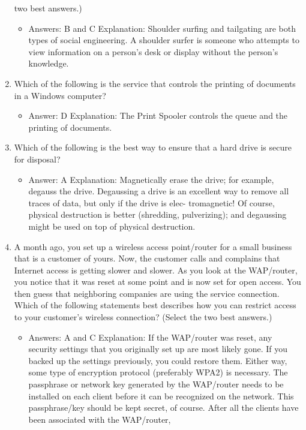 \documentclass{article}
\begin{document}
\begin{enumerate}
two best answers.)
    \begin{itemize}
        \item Answers: B and C
Explanation: Shoulder surfing and tailgating are both types of social engineering. A
shoulder surfer is someone who attempts to view information on a person’s desk or
display without the person’s knowledge.
    \end{itemize}
    \item Which of the following is the service that controls the printing of
documents in a Windows computer?
    \begin{itemize}
        \item Answer: D
Explanation: The Print Spooler controls the queue and the printing of documents.
    \end{itemize}
    \item Which of the following is the best way to ensure that a hard drive
is secure for disposal?
    \begin{itemize}
        \item Answer: A
Explanation: Magnetically erase the drive; for example, degauss the drive. Degaussing
a drive is an excellent way to remove all traces of data, but only if the drive is elec-
tromagnetic! Of course, physical destruction is better (shredding, pulverizing); and
degaussing might be used on top of physical destruction.
    \end{itemize}
    \item A month ago, you set up a wireless access point/router for a small
business that is a customer of yours. Now, the customer calls and
complains that Internet access is getting slower and slower. As you
look at the WAP/router, you notice that it was reset at some point
and is now set for open access. You then guess that neighboring
companies are using the service connection. Which of the following
statements best describes how you can restrict access to your
customer’s wireless connection? (Select the two best answers.)
    \begin{itemize}
        \item Answers: A and C
Explanation: If the WAP/router was reset, any security settings that you originally set
up are most likely gone. If you backed up the settings previously, you could restore
them. Either way, some type of encryption protocol (preferably WPA2) is necessary.
The passphrase or network key generated by the WAP/router needs to be installed on
each client before it can be recognized on the network. This passphrase/key should be
kept secret, of course. After all the clients have been associated with the WAP/router,

\end{itemize}
\end{enumerate}
\end{document}
